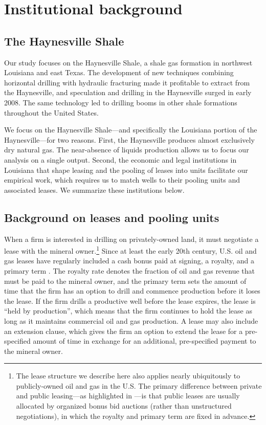 \documentclass[12pt]{article}
\begin{document}
\section{Institutional background \label{sec:Inst}}

\subsection{The Haynesville Shale}

Our study focuses on the Haynesville Shale, a shale gas formation in northwest Louisiana and east Texas. The development of new techniques combining horizontal drilling with hydraulic fracturing made it profitable to extract from the Haynesville, and speculation and drilling in the Haynesville surged in early 2008. The same technology led to drilling booms in other shale formations throughout the United States.

We focus on the Haynesville Shale---and specifically the Louisiana portion of the Haynesville---for two reasons. First, the Haynesville produces almost exclusively dry natural gas. The near-absence of liquids production allows us to focus our analysis on a single output. Second, the economic and legal institutions in Louisiana that shape leasing and the pooling of leases into units facilitate our empirical work, which requires us to match wells to their pooling units and associated leases. We summarize these institutions below.


\subsection{Background on leases and pooling units}

When a firm is interested in drilling on privately-owned land, it must negotiate a lease with the mineral owner.\footnote{The lease structure we describe here also applies nearly ubiquitously to publicly-owned oil and gas in the U.S. The primary difference between private and public leasing---as highlighted in \citet{bib:covertsweeney}---is that public leases are usually allocated by organized bonus bid auctions (rather than unstructured negotiations), in which the royalty and primary term are fixed in advance.} Since at least the early 20th century, U.S. oil and gas leases have regularly included a cash bonus paid at signing, a royalty, and a primary term \citep{bib:smith}. The royalty rate denotes the fraction of oil and gas revenue that must be paid to the mineral owner, and the primary term sets the amount of time that the firm has an option to drill and commence production before it loses the lease. If the firm drills a productive well before the lease expires, the lease is ``held by production'', which means that the firm continues to hold the lease as long as it maintains commercial oil and gas production. A lease may also include an extension clause, which gives the firm an option to extend the lease for a pre-specified amount of time in exchange for an additional, pre-specified payment to the mineral owner.
\end{document}
